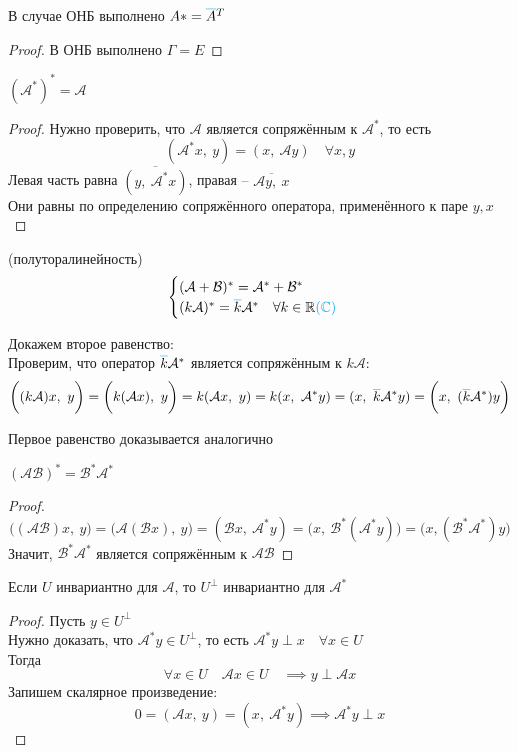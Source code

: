 \begin{props}
	\item В случае ОНБ выполнено $ A* = \color{cyan}\overline{\color{black}A}\color{black}^T $
	\begin{proof}
		В ОНБ выполнено $ \Gamma = E $
	\end{proof}
	\item $ (\mathcal{A}^*)^* = \mathcal{A} $
	\begin{proof}
		Нужно проверить, что $ \mathcal{A} $ является сопряжённым к $ \mathcal{A}^* $, то есть
		$$ (\mathcal{A}^*x, ~ y) = (x, ~ \mathcal{A}y) \quad \forall x, y $$
		Левая часть равна $ \overline{(y, ~ \mathcal{A}^*x)} $, правая -- $ \overline{\mathcal{A}y, ~ x} $ \\
		Они равны по определению сопряжённого оператора, применённого к паре $ y, x $
	\end{proof}
	\item (полуторалинейность)
	$$
	\begin{cases}
		(\mathcal{A} + \mathcal{B})^* = \mathcal{A}^* + \mathcal{B}^* \\
		(k\mathcal{A})^* = \color{cyan}\overline{\color{black}k}\color{black}\mathcal{A}^* \quad \forall k \in \mathbb{R} \color{cyan} (\mathbb{C})
	\end{cases} $$
	\begin{iproof}
		\item Докажем второе равенство: \\
		Проверим, что оператор $ \color{cyan}\overline{\color{black}k}\color{black}\mathcal{A}^* $ является сопряжённым к $ k\mathcal{A} $:
		$$ \bigg( (k\mathcal{A})x, ~ y \bigg) = \bigg( k(\mathcal{A}x), ~ y \bigg) = k(\mathcal{A}x, ~ y) = k(x, ~ \mathcal{A}^*y) = (x, ~ \color{cyan}\overline{\color{black}k}\color{black}\mathcal{A}^*y) = \bigg( x, ~ (\color{cyan}\overline{\color{black}k}\color{black}\mathcal{A}^*)y \bigg) $$
		\item Первое равенство доказывается аналогично
	\end{iproof}
	\item $ (\mathcal{A}\mathcal{B})^* = \mathcal{B}^*\mathcal{A}^* $
	\begin{proof}
		$$ \bigg( (\mathcal{A}\mathcal{B})x, ~ y \bigg) = \bigg( \mathcal{A}(\mathcal{B}x), ~ y \bigg) = (\mathcal{B}x, ~ \mathcal{A}^*y) = \bigg( x, ~ \mathcal{B}^*(\mathcal{A}^*y) \bigg) = \bigg( x, (\mathcal{B}^*\mathcal{A}^*)y \bigg) $$
		Значит, $ \mathcal{B}^*\mathcal{A}^* $ является сопряжённым к $ \mathcal{A}\mathcal{B} $
	\end{proof}
	\item Если $ U $ инвариантно для $ \mathcal{A} $, то $ U^\perp $ инвариантно для $ \mathcal{A}^* $
	\begin{proof}
		Пусть $ y \in U^\perp $ \\
		Нужно доказать, что $ \mathcal{A}^*y \in U^\perp $, то есть $ \mathcal{A}^*y \perp x \quad \forall x \in U $ \\
		Тогда
		$$ \forall x \in U \quad \mathcal{A}x \in U \quad \implies y \perp \mathcal{A}x $$
		Запишем скалярное произведение:
		$$ 0 = (\mathcal{A}x, ~ y) = (x, ~ \mathcal{A}^*y) \implies \mathcal{A}^*y \perp x $$
	\end{proof}
\end{props}

